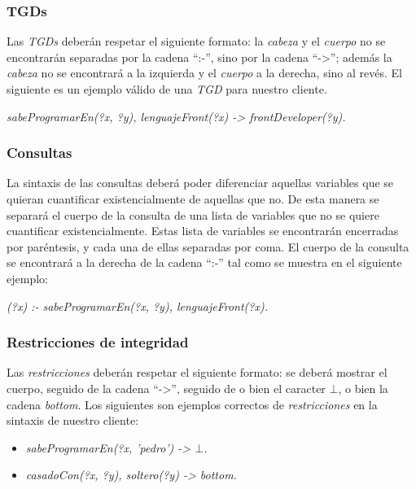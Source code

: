 \documentclass[11pt,a4paper,twoside]{tesis}
\begin{document}
\subsubsection{TGDs}

Las \textit{TGDs} deberán respetar el siguiente formato: la \textit{cabeza} y el \textit{cuerpo} no se encontrarán separadas por la cadena ``:-'', sino por la cadena ``->''; además la \textit{cabeza} no se encontrará a la izquierda y el \textit{cuerpo} a la derecha, sino al revés. El siguiente es un ejemplo válido de una \textit{TGD} para nuestro cliente.

\begin{center}
 \textit{sabeProgramarEn(?x, ?y), lenguajeFront(?x) ->  frontDeveloper(?y).}
\end{center}

\subsubsection{Consultas}

La sintaxis de las consultas deberá poder diferenciar aquellas variables que se quieran cuantificar existencialmente de aquellas que no. De esta manera se separará el cuerpo de la consulta de una lista de variables que no se quiere cuantificar existencialmente. Estas lista de variables se encontrarán encerradas por paréntesis, y cada una de ellas separadas por coma. El cuerpo de la consulta se encontrará a la derecha de la cadena ``:-'' tal como se muestra en el siguiente ejemplo:

\begin{center}
 \textit{(?x) :- sabeProgramarEn(?x, ?y), lenguajeFront(?x).}
\end{center}

\subsubsection{Restricciones de integridad}

Las \textit{restricciones} deberán respetar el siguiente formato: se deberá mostrar el cuerpo, seguido de la cadena ``->'', seguido de o bien el caracter $\bot$, o bien la cadena \textit{bottom}. Los siguientes son ejemplos correctos de \textit{restricciones} en la sintaxis de nuestro cliente:

\begin{itemize}
    \item \textit{sabeProgramarEn(?x, 'pedro') -> $\bot$.}
    \item \textit{casadoCon(?x, ?y), soltero(?y) -> bottom.}
\end{itemize}
\end{document}

